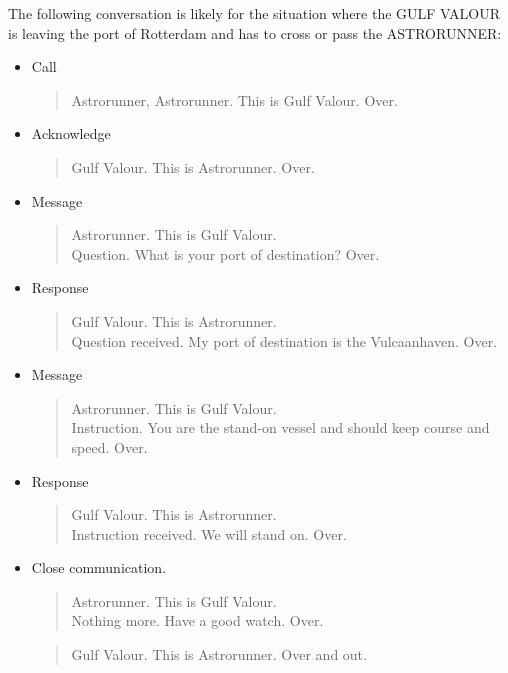 The following conversation is likely for the situation where the GULF VALOUR is leaving the port of Rotterdam and has to cross or pass the ASTRORUNNER:
\begin{spacing}{1}
	\begin{itemize}
		\item Call
		\begin{quote}
			Astrorunner, Astrorunner. This is Gulf Valour. Over.
		\end{quote}
		\item Acknowledge
		\begin{quote}
			Gulf Valour. This is Astrorunner. Over.
		\end{quote}
		\item Message
		\begin{quote}
			Astrorunner. This is Gulf Valour. \\
			Question. What is your port of destination? Over.
		\end{quote}
		\item Response
		\begin{quote}
			Gulf Valour. This is Astrorunner. \\
			Question received. My port of destination is the Vulcaanhaven. Over.
		\end{quote}
		\item Message
		\begin{quote}
			Astrorunner. This is Gulf Valour. \\
			Instruction. You are the stand-on vessel and should keep course and speed. Over.
		\end{quote}
		\item Response
		\begin{quote}
			Gulf Valour. This is Astrorunner. \\
			Instruction received. We will stand on. Over.
		\end{quote}
		\item Close communication.
		\begin{quote}
			Astrorunner. This is Gulf Valour. \\
			Nothing more. Have a good watch. Over.
		\end{quote}
		\begin{quote}
			Gulf Valour. This is Astrorunner. Over and out.
		\end{quote}
	\end{itemize}
\end{spacing}

